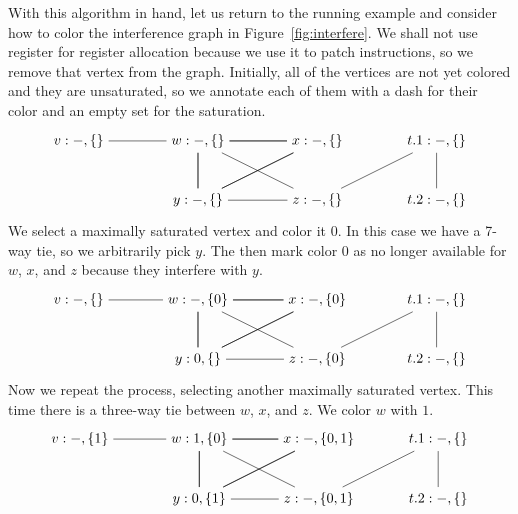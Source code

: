 \documentclass[11pt]{book}
\begin{document}
With this algorithm in hand, let us return to the running example and
consider how to color the interference graph in
Figure~\ref{fig:interfere}. We shall not use register  for
register allocation because we use it to patch instructions, so we
remove that vertex from the graph.  Initially, all of the vertices are
not yet colored and they are unsaturated, so we annotate each of them
with a dash for their color and an empty set for the saturation.
\[
\begin{tikzpicture}[baseline=(current  bounding  box.center)]
\node (v) at (0,0)    {$v:-,\{\}$};
\node (w) at (3,0)    {$w:-,\{\}$};
\node (x) at (6,0)    {$x:-,\{\}$};
\node (y) at (3,-1.5) {$y:-,\{\}$};
\node (z) at (6,-1.5) {$z:-,\{\}$};
\node (t1) at (9,0)   {$t.1:-,\{\}$};
\node (t2) at (9,-1.5) {$t.2:-,\{\}$};

\draw (v) to (w);
\foreach \i in {w,x,y}
{
  \foreach \j in {w,x,y}
  {
    \draw (\i) to (\j);
  }
}
\draw (z) to (w);
\draw (z) to (y);
\draw (t1) to (z);
\draw (t2) to (t1);
\end{tikzpicture}
\]
We select a maximally saturated vertex and color it $0$. In this case we
have a 7-way tie, so we arbitrarily pick $y$. The then mark color $0$
as no longer available for $w$, $x$, and $z$ because they interfere
with $y$.
\[
\begin{tikzpicture}[baseline=(current  bounding  box.center)]
\node (v) at (0,0)    {$v:-,\{\}$};
\node (w) at (3,0)    {$w:-,\{0\}$};
\node (x) at (6,0)    {$x:-,\{0\}$};
\node (y) at (3,-1.5) {$y:0,\{\}$};
\node (z) at (6,-1.5) {$z:-,\{0\}$};
\node (t1) at (9,0)   {$t.1:-,\{\}$};
\node (t2) at (9,-1.5) {$t.2:-,\{\}$};
\draw (v) to (w);
\foreach \i in {w,x,y}
{
  \foreach \j in {w,x,y}
  {
    \draw (\i) to (\j);
  }
}
\draw (z) to (w);
\draw (z) to (y);
\draw (t1) to (z);
\draw (t2) to (t1);
\end{tikzpicture}
\]
Now we repeat the process, selecting another maximally saturated vertex.
This time there is a three-way tie between $w$, $x$, and $z$. We color
$w$ with $1$.
\[
\begin{tikzpicture}[baseline=(current  bounding  box.center)]
\node (v) at (0,0)    {$v:-,\{1\}$};
\node (w) at (3,0)    {$w:1,\{0\}$};
\node (x) at (6,0)    {$x:-,\{0,1\}$};
\node (y) at (3,-1.5) {$y:0,\{1\}$};
\node (z) at (6,-1.5) {$z:-,\{0,1\}$};
\node (t1) at (9,0)   {$t.1:-,\{\}$};
\node (t2) at (9,-1.5) {$t.2:-,\{\}$};
\draw (t1) to (z);
\draw (t2) to (t1);
\draw (v) to (w);
\foreach \i in {w,x,y}
{
  \foreach \j in {w,x,y}
  {
    \draw (\i) to (\j);
  }
}
\draw (z) to (w);
\draw (z) to (y);
\end{tikzpicture}
\]
\end{document}
